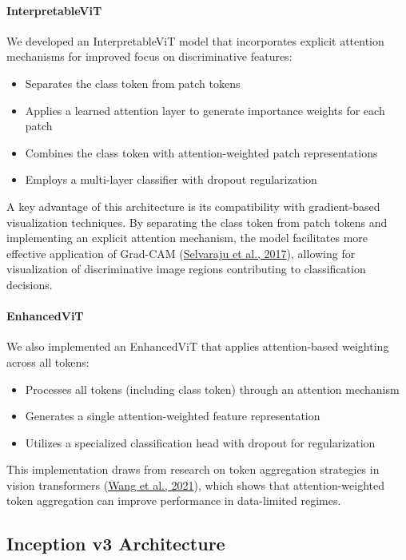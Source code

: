 \documentclass[a4paper,12pt]{article}
\begin{document}
\paragraph{InterpretableViT}
We developed an InterpretableViT model that incorporates explicit attention mechanisms for improved focus on discriminative features:

\begin{itemize}
    \item Separates the class token from patch tokens
    \item Applies a learned attention layer to generate importance weights for each patch
    \item Combines the class token with attention-weighted patch representations
    \item Employs a multi-layer classifier with dropout regularization
\end{itemize}

A key advantage of this architecture is its compatibility with gradient-based visualization techniques. By separating the class token from patch tokens and implementing an explicit attention mechanism, the model facilitates more effective application of Grad-CAM (\href{https://arxiv.org/abs/1610.02391}{Selvaraju et al., 2017}), allowing for visualization of discriminative image regions contributing to classification decisions.

\paragraph{EnhancedViT}
We also implemented an EnhancedViT that applies attention-based weighting across all tokens:

\begin{itemize}
    \item Processes all tokens (including class token) through an attention mechanism
    \item Generates a single attention-weighted feature representation
    \item Utilizes a specialized classification head with dropout for regularization
\end{itemize}

This implementation draws from research on token aggregation strategies in vision transformers (\href{https://arxiv.org/abs/2012.09688}{Wang et al., 2021}), which shows that attention-weighted token aggregation can improve performance in data-limited regimes.

\subsection{Inception v3 Architecture}
\end{document}
